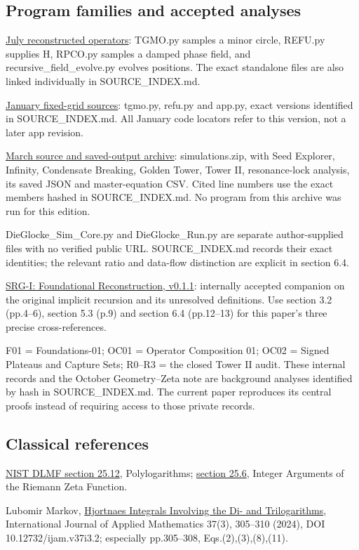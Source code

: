 \documentclass[11pt,a4paper]{article}
\begin{document}
\subsection*{Program families and accepted analyses}

\href{https://zenodo.org/records/17253999}{July reconstructed operators}: TGMO.py samples a minor circle, REFU.py supplies H, RPCO.py samples a damped phase field, and recursive\_\allowbreak{}field\_\allowbreak{}evolve.py evolves positions. The exact standalone files are also linked individually in SOURCE\_\allowbreak{}INDEX.md.


\href{https://zenodo.org/records/18285147}{January fixed-grid sources}: tgmo.py, refu.py and app.py, exact versions identified in SOURCE\_\allowbreak{}INDEX.md. All January code locators refer to this version, not a later app revision.


\href{https://zenodo.org/records/19023429}{March source and saved-output archive}: simulations.zip, with Seed Explorer, Infinity, Condensate Breaking, Golden Tower, Tower II, resonance-lock analysis, its saved JSON and master-equation CSV. Cited line numbers use the exact members hashed in SOURCE\_\allowbreak{}INDEX.md. No program from this archive was run for this edition.


DieGlocke\_\allowbreak{}Sim\_\allowbreak{}Core.py and DieGlocke\_\allowbreak{}Run.py are separate author-supplied files with no verified public URL. SOURCE\_\allowbreak{}INDEX.md records their exact identities; the relevant ratio and data-flow distinction are explicit in section 6.4.


\href{https://github.com/pzychozen/trioctagon-physics/blob/26a3f666c3082144e37fa08b752d5221053dd3bc/SRG_REDISCOVERY/PAPERS/SRG_I_FOUNDATIONAL_RECONSTRUCTION/publication/v0.1.1/README.md}{SRG-I: Foundational Reconstruction, v0.1.1}: internally accepted companion on the original implicit recursion and its unresolved definitions. Use section 3.2 (pp.4--6), section 5.3 (p.9) and section 6.4 (pp.12--13) for this paper's three precise cross-references.


F01 = Foundations-01; OC01 = Operator Composition 01; OC02 = Signed Plateaus and Capture Sets; R0--R3 = the closed Tower II audit. These internal records and the October Geometry--Zeta note are background analyses identified by hash in SOURCE\_\allowbreak{}INDEX.md. The current paper reproduces its central proofs instead of requiring access to those private records.


\subsection*{Classical references}

\href{https://dlmf.nist.gov/25.12}{NIST DLMF section 25.12}, Polylogarithms; \href{https://dlmf.nist.gov/25.6}{section 25.6}, Integer Arguments of the Riemann Zeta Function.


Lubomir Markov, \href{https://www.diogenes.bg/ijam/contents/2024-37-3/2/2.pdf}{Hjortnaes Integrals Involving the Di- and Trilogarithms}, International Journal of Applied Mathematics 37(3), 305--310 (2024), DOI 10.12732/ijam.v37i3.2; especially pp.305--308, Eqs.(2),(3),(8),(11).
\end{document}

